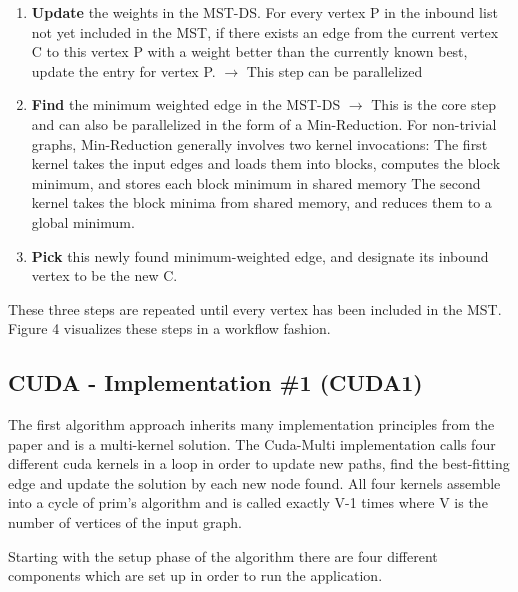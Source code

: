 \documentclass[sigconf,nonacm]{acmart}
\begin{document}
\begin{enumerate}
\item \textbf{Update} the weights in the MST-DS. For every vertex P in the inbound list not yet included in the MST, if there exists an edge from the current vertex C to this vertex P with a weight better than the currently known best, update the entry for vertex P.
$\rightarrow$ This step can be parallelized
\item \textbf{Find} the minimum weighted edge in the MST-DS
$\rightarrow$ This is the core step and can also be parallelized in the form of a Min-Reduction. For non-trivial graphs, Min-Reduction generally involves two kernel invocations:
The first kernel takes the input edges and loads them into blocks, computes the  block minimum, and stores each block minimum in shared memory
The second kernel takes the block minima from shared memory, and reduces them to a global minimum.
\item \textbf{Pick} this newly found minimum-weighted edge, and designate its inbound vertex to be the new C.
\end{enumerate}

These three steps are repeated until every vertex has been included in the MST. Figure 4 visualizes these steps in a workflow fashion.

\subsection{CUDA - Implementation \#1 (CUDA1)}

The first algorithm approach inherits many implementation principles from the paper and is a multi-kernel solution. The Cuda-Multi implementation calls four different cuda kernels in a loop in order to update new paths, find the best-fitting edge and update the solution by each new node found. All four kernels assemble into a cycle of prim’s algorithm and is called exactly V-1 times where V is the number of vertices of the input graph.

Starting with the setup phase of the algorithm there are four different components which are set up in order to run the application.
\end{document}
